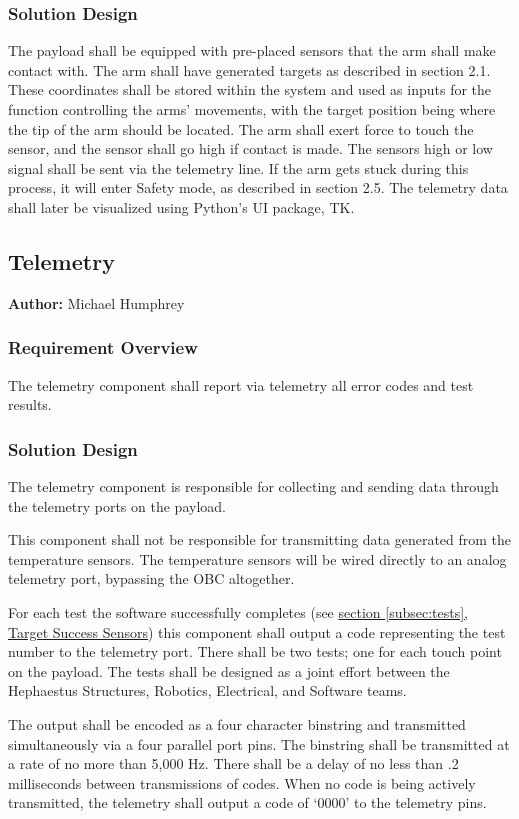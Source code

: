 \documentclass[letterpaper,10pt]{article}
\begin{document}
\subsubsection{Solution Design}
The payload shall be equipped with pre-placed sensors that the arm shall make contact with. The arm shall have generated targets
as described in section 2.1. These coordinates shall be stored within the system and used as inputs for the function controlling
the arms' movements, with the target position being where the tip of the arm should be located. The arm shall exert force to touch
the sensor, and the sensor shall go high if contact is made. The sensors high or low signal shall be sent via the telemetry
line. If the arm gets stuck during this process, it will enter Safety mode, as described in section 2.5. The telemetry data shall
later be visualized using Python's UI package, TK. 

\subsection{Telemetry}
\textbf{Author:} Michael Humphrey
\subsubsection{Requirement Overview}
The telemetry component shall report via telemetry all error codes and test results.

\subsubsection{Solution Design}
The telemetry component is responsible for collecting and sending data through the
telemetry ports on the \gls{payload}.

This component shall not be responsible for transmitting data generated from the
temperature sensors.
The temperature sensors will be wired directly to an analog telemetry port,
bypassing the \gls{OBC} altogether.

For each test the software successfully completes (see \hyperref[subsec:tests]{section 
\ref*{subsec:tests},  Target Success Sensors}) this component shall output a code
representing the test number to the telemetry port.
There shall be two tests; one for each touch point on the \gls{payload}.
The tests shall be designed as a joint effort between the Hephaestus Structures,
Robotics, Electrical, and Software teams.

The output shall be encoded as a four character \gls{binstring} and transmitted
simultaneously via a four parallel port pins.
The \gls{binstring} shall be transmitted at a rate of no more than 5,000 Hz.
There shall be a delay of no less than .2 milliseconds between transmissions
of codes.
When no code is being actively transmitted, the telemetry shall output a code
of `0000' to the telemetry pins.
\end{document}
